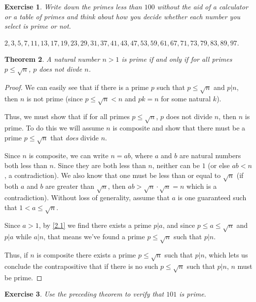 \documentclass{article}
\newtheorem{thm}{Theorem}[section]
\newtheorem{ex}[thm]{Exercise}
\numberwithin{equation}{thm}
\begin{document}
\begin{ex} \label{2.2}
  Write down the primes less than $100$ without the aid of a calculator or a table of primes and think about how you decide whether each number you select is prime or not.
\end{ex}

$2, 3, 5, 7, 11, 13, 17, 19, 23, 29, 31, 37, 41, 43, 47, 53, 59, 61, 67, 71, 73, 79, 83, 89, 97$.



\begin{thm} \label{2.3}
  A natural number $n > 1$ is prime if and only if for all primes $p \leq \sqrt{n}$, $p$ does not divde $n$.
\end{thm}

\begin{proof}
  We can easily see that if there is a prime $p$ such that $p \leq \sqrt{n}$ and $p | n$, then $n$ is not prime (since $p \leq \sqrt{n} < n$ and $pk = n$ for some natural $k$).

  Thus, we must show that if for all primes $p \leq \sqrt{n}$, $p$ does not divide $n$, then $n$ is prime. To do this we will assume $n$ is composite and show that there must be a prime $p \leq \sqrt{n}$ that \emph{does} divide $n$.

  Since $n$ is composite, we can write $n = ab$, where $a$ and $b$ are natural numbers both less than $n$. Since they are both less than $n$, neither can be $1$ (or else $ab < n$, a contradiction). We also know that one must be less than or equal to $\sqrt{n}$ (if both $a$ and $b$ are greater than $\sqrt{n}$, then $ab > \sqrt{n} \cdot \sqrt{n} = n$ which is a contradiction). Without loss of generality, assume that $a$ is one guaranteed such that $1 < a \leq \sqrt{n}$.

  Since $a > 1$, by \ref{2.1} we find there exists a prime $p | a$, and since $p \leq a \leq \sqrt{n}$ and $p | a$ while $a | n$, that means we've found a prime $p \leq \sqrt{n}$ such that $p | n$.

  Thus, if $n$ is composite there exists a prime $p \leq \sqrt{n}$ such that $p | n$, which lets us conclude the contrapositive that if there is no such $p \leq \sqrt{n}$ such that $p | n$, $n$ must be prime.
\end{proof}



\begin{ex} \label{2.4}
  Use the preceding theorem to verify that $101$ is prime.
\end{ex}
\end{document}

